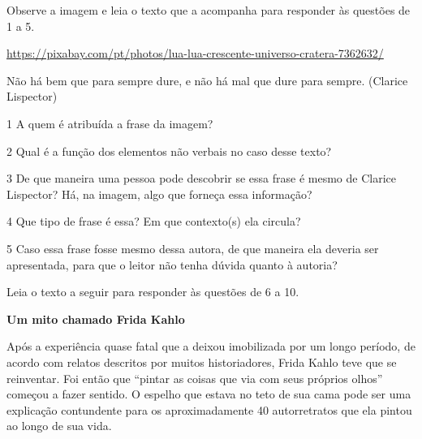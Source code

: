 Observe a imagem e leia o texto que a acompanha para responder às
questões de 1 a 5.

\url{https://pixabay.com/pt/photos/lua-lua-crescente-universo-cratera-7362632/}

Não há bem que para sempre dure, e não há mal que dure para sempre.
(Clarice Lispector)


\num{1} A quem é atribuída a frase da imagem?



\num{2} Qual é a função dos elementos não verbais no caso desse texto?



\num{3} De que maneira uma pessoa pode descobrir se essa frase é mesmo
de Clarice Lispector? Há, na imagem, algo que forneça essa informação?



\num{4} Que tipo de frase é essa? Em que contexto(s) ela circula?



\num{5} Caso essa frase fosse mesmo dessa autora, de que maneira ela
deveria ser apresentada, para que o leitor não tenha dúvida quanto à
autoria?



Leia o texto a seguir para responder às questões de 6 a 10.

\textbf{Um mito chamado Frida Kahlo}

Após a experiência quase fatal que a deixou imobilizada por um longo
período, de acordo com relatos descritos por muitos historiadores, Frida
Kahlo teve que se reinventar. Foi então que ``pintar as coisas que via
com seus próprios olhos'' começou a fazer sentido. O espelho que estava
no teto de sua cama pode ser uma explicação contundente para os
aproximadamente 40 autorretratos que ela pintou ao longo de sua vida.

